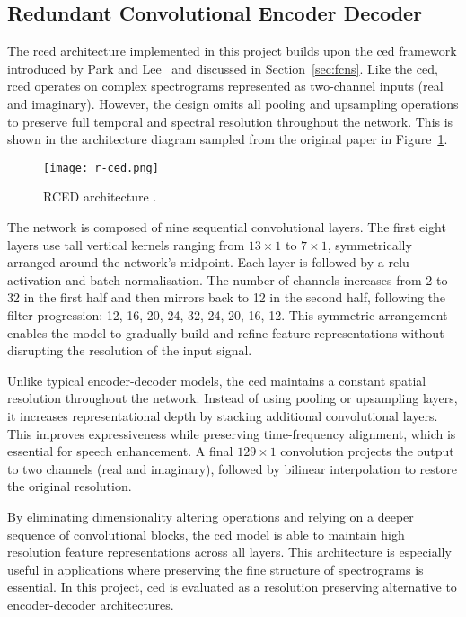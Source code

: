 \subsection{Redundant Convolutional Encoder Decoder}
\label{sec:rced}

The \gls{rced} architecture implemented in this project builds upon the \gls{ced} framework introduced by Park and Lee~\cite{park2017acoustic} and discussed in Section~\ref{sec:fcns}. Like the \gls{ced}, \gls{rced} operates on complex spectrograms represented as two-channel inputs (real and imaginary). However, the design omits all pooling and upsampling operations to preserve full temporal and spectral resolution throughout the network. This is shown in the architecture diagram sampled from the original paper in Figure~\ref{fig:rced}.

\begin{figure}[h]
    \centering
    \texttt{[image: r-ced.png]}
    \caption{\label{fig:rced}RCED architecture \cite{park2017acoustic}.}
\end{figure}

The network is composed of nine sequential convolutional layers. The first eight layers use tall vertical kernels ranging from \(13 \times 1\) to \(7 \times 1\), symmetrically arranged around the network's midpoint. Each layer is followed by a \gls{relu} activation and batch normalisation. The number of channels increases from 2 to 32 in the first half and then mirrors back to 12 in the second half, following the filter progression: 12, 16, 20, 24, 32, 24, 20, 16, 12. This symmetric arrangement enables the model to gradually build and refine feature representations without disrupting the resolution of the input signal.

Unlike typical encoder-decoder models, the \gls{ced} maintains a constant spatial resolution throughout the network. Instead of using pooling or upsampling layers, it increases representational depth by stacking additional convolutional layers. This improves expressiveness while preserving time-frequency alignment, which is essential for speech enhancement. A final 
\(129 \times 1\) convolution projects the output to two channels (real and imaginary), followed by bilinear interpolation to restore the original resolution.

By eliminating dimensionality altering operations and relying on a deeper sequence of convolutional blocks, the \gls{ced} model is able to maintain high resolution feature representations across all layers. This architecture is especially useful in applications where preserving the fine structure of spectrograms is essential. In this project, \gls{ced} is evaluated as a resolution preserving alternative to encoder-decoder architectures.

